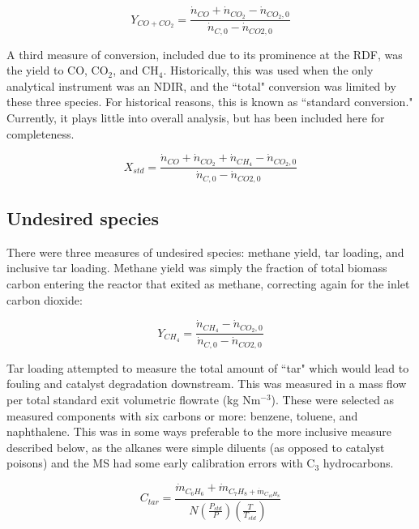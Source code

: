 \documentclass[11pt,twocolumn]{article}
\begin{document}
\begin{equation}
	Y_{CO+CO_{2}} = \frac{\dot{n}_{CO}+\dot{n}_{CO_{2}}-\dot{n}_{CO_{2},0}}{\dot{n}_{C,0}-\dot{n}_{CO{2},0}}
\end{equation}

A third measure of conversion, included due to its prominence at the RDF, was the yield to CO, CO$_2$, and CH$_4$.  Historically, this was used when the only analytical instrument was an NDIR, and the ``total" conversion was limited by these three species.  For historical reasons, this is known as ``standard conversion."  Currently, it plays little into overall analysis, but has been included here for completeness.

\begin{equation}
	X_{std} =  \frac{\dot{n}_{CO}+\dot{n}_{CO_{2}}+\dot{n}_{CH_{4}}-\dot{n}_{CO_{2},0}}{\dot{n}_{C,0}-\dot{n}_{CO{2},0}}
\end{equation}

\subsection*{Undesired species}

There were three measures of undesired species: methane yield, tar loading, and inclusive tar loading.  Methane yield was simply the fraction of total biomass carbon entering the reactor that exited as methane, correcting again for the inlet carbon dioxide:

\begin{equation}
	Y_{CH_{4}} = \frac{\dot{n}_{CH_{4}}-\dot{n}_{CO_{2},0}}{\dot{n}_{C,0}-\dot{n}_{CO{2},0}}
\end{equation}

Tar loading attempted to measure the total amount of ``tar" which would lead to fouling and catalyst degradation downstream.  This was measured in a mass flow per total standard exit volumetric flowrate (kg Nm$^{-3}$).  These were selected as measured components with six carbons or more: benzene, toluene, and naphthalene.  This was in some ways preferable to the more inclusive measure described below, as the alkanes were simple diluents (as opposed to catalyst poisons) and the MS had some early calibration errors with C$_3$ hydrocarbons.

\begin{equation}
	C_{tar} = \frac{\dot{m}_{C_{6}H_{6}}+\dot{m}_{C_{7}H_{8}+\dot{m}_{C_{10}H_{8}}}}{N\left(\frac{P_{std}}{P}\right)\left(\frac{T}{T_{std}}\right)}
\end{equation}
\end{document}
